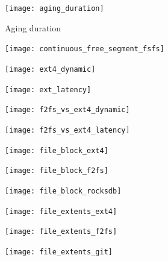\begin{figure}[t]
    \centering
	\texttt{[image: aging\_duration]}
    \caption{Aging duration}
    \label{f:aging_duration}
\end{figure}

\begin{figure}[t]
    \centering
	\texttt{[image: continuous\_free\_segment\_fsfs]}
	\caption{}
	\label{f:}
\end{figure}

\begin{figure}[t]
    \centering
	\texttt{[image: ext4\_dynamic]}
	\caption{}
	\label{f:}
\end{figure}

\begin{figure}[t]
    \centering
	\texttt{[image: ext\_latency]}
	\caption{}
	\label{f:}
\end{figure}

\begin{figure}[t]
    \centering
	\texttt{[image: f2fs\_vs\_ext4\_dynamic]}
	\caption{}
	\label{f:}
\end{figure}

\begin{figure}[t]
    \centering
	\texttt{[image: f2fs\_vs\_ext4\_latency]}
	\caption{}
	\label{f:}
\end{figure}

\begin{figure}[t]
    \centering
	\texttt{[image: file\_block\_ext4]}
	\caption{}
	\label{f:}
\end{figure}

\begin{figure}[t]
    \centering
	\texttt{[image: file\_block\_f2fs]}
	\caption{}
	\label{f:}
\end{figure}

\begin{figure}[t]
    \centering
	\texttt{[image: file\_block\_rocksdb]}
	\caption{}
	\label{f:}
\end{figure}

\begin{figure}[t]
    \centering
	\texttt{[image: file\_extents\_ext4]}
	\caption{}
	\label{f:}
\end{figure}

\begin{figure}[t]
    \centering
	\texttt{[image: file\_extents\_f2fs]}
	\caption{}
	\label{f:}
\end{figure}

\begin{figure}[t]
    \centering
	\texttt{[image: file\_extents\_git]}
	\caption{}
	\label{f:}
\end{figure}

